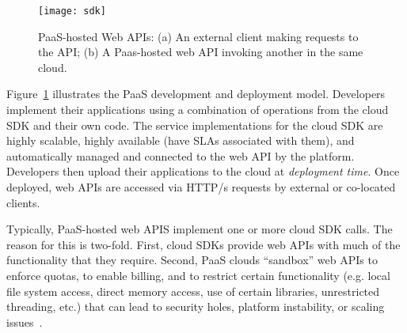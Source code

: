 
\begin{figure}
\centering
\texttt{[image: sdk]}
\caption{PaaS-hosted Web APIs: (a) An external client making requests
to the API;
(b) A Paas-hosted web API invoking another in the same cloud.
\label{fig:cloud_app_model}
}
\vspace{-0.2in}
\end{figure}

Figure~\ref{fig:cloud_app_model} illustrates the PaaS development and deployment model.
Developers implement their applications using a combination of operations
from the cloud SDK and their own code.  The service implementations for the 
cloud SDK are highly scalable, highly available (have SLAs associated with them),
and automatically managed and connected to the web API by the platform. Developers
then upload their applications to the cloud at \textit{deployment time}.
Once deployed, web APIs are accessed via HTTP/s requests by external or co-located clients.

Typically, PaaS-hosted web APIS implement one or more
cloud SDK calls.  The reason for this is two-fold.  First, 
cloud SDKs provide web APIs with much of the functionality that they require.
Second, PaaS clouds ``sandbox'' web APIs to enforce quotas, to enable billing,
and to restrict certain functionality
(e.g. local file system access, direct memory access, use of certain libraries, unrestricted threading, etc.) that can lead to security holes, platform instability, or scaling issues~\cite{gae-sandbox}.

